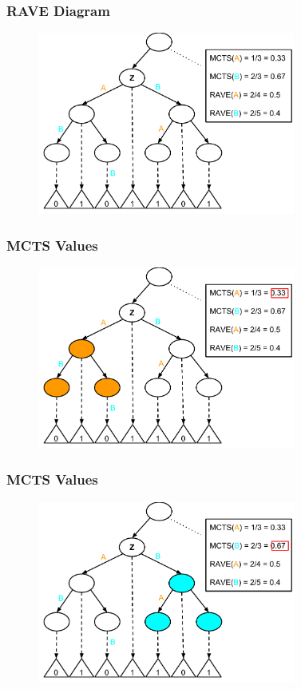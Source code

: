 \documentclass{beamer}
\begin{document}
\begin{frame}[fragile]
\frametitle{RAVE Diagram}
\begin{figure}[h]
	\includegraphics[width=8.5cm]{Diagrams/Rave/RAVEDiagram.pdf}
	\centering
\end{figure}
\end{frame}

\begin{frame}[fragile]
\frametitle{MCTS Values}
\begin{figure}[h]
	\includegraphics[width=8.5cm]{Diagrams/Rave/MCTSValueA.pdf}
	\centering
\end{figure}
\end{frame}

\begin{frame}[fragile]
\frametitle{MCTS Values}
\begin{figure}[h]
	\includegraphics[width=8.5cm]{Diagrams/Rave/MCTSValueB.pdf}
	\centering
\end{figure}
\end{frame}
\end{document}
